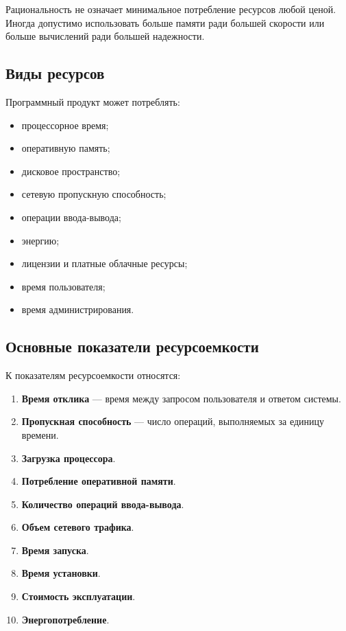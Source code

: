 \documentclass[12pt,a4paper]{article}
\begin{document}
Рациональность не означает минимальное потребление ресурсов любой ценой. Иногда допустимо использовать больше памяти ради большей скорости или больше вычислений ради большей надежности.

\subsection{Виды ресурсов}

Программный продукт может потреблять:
\begin{itemize}
    \item процессорное время;
    \item оперативную память;
    \item дисковое пространство;
    \item сетевую пропускную способность;
    \item операции ввода-вывода;
    \item энергию;
    \item лицензии и платные облачные ресурсы;
    \item время пользователя;
    \item время администрирования.
\end{itemize}

\subsection{Основные показатели ресурсоемкости}

К показателям ресурсоемкости относятся:

\begin{enumerate}
    \item \textbf{Время отклика} --- время между запросом пользователя и ответом системы.
    \item \textbf{Пропускная способность} --- число операций, выполняемых за единицу времени.
    \item \textbf{Загрузка процессора}.
    \item \textbf{Потребление оперативной памяти}.
    \item \textbf{Количество операций ввода-вывода}.
    \item \textbf{Объем сетевого трафика}.
    \item \textbf{Время запуска}.
    \item \textbf{Время установки}.
    \item \textbf{Стоимость эксплуатации}.
    \item \textbf{Энергопотребление}.
\end{enumerate}
\end{document}
